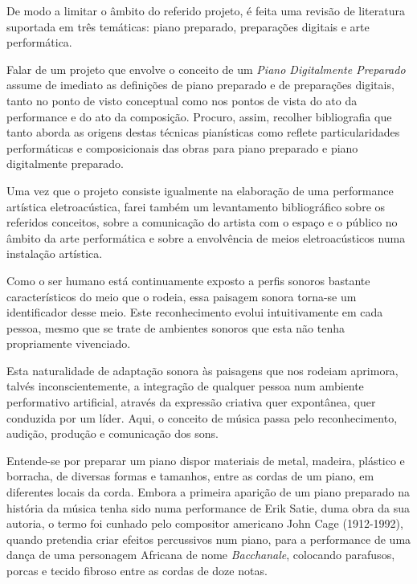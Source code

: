 \documentclass[../main.tex]{subfiles}
\begin{document}
De modo a limitar o âmbito do referido projeto, é feita uma revisão de literatura suportada em três temáticas: piano preparado, preparações digitais e arte performática.

Falar de um projeto que envolve o conceito de um \textit{Piano Digitalmente Preparado} assume de imediato as definições de piano preparado e de preparações digitais, tanto no ponto de visto conceptual como nos pontos de vista do ato da performance e do ato da composição. Procuro, assim, recolher bibliografia que tanto aborda as origens destas técnicas pianísticas como reflete particularidades performáticas e composicionais das obras para piano preparado e piano digitalmente preparado.

Uma vez que o projeto consiste igualmente na elaboração de uma performance artística eletroacústica, farei também um levantamento bibliográfico sobre os referidos conceitos, sobre a comunicação do artista com o espaço e o público no âmbito da arte performática e sobre a envolvência de meios eletroacústicos numa instalação artística.

Como o ser humano está continuamente exposto a perfis sonoros bastante característicos do meio que o rodeia, essa paisagem sonora torna-se um identificador desse meio\cite{schafer1993}. Este reconhecimento evolui intuitivamente em cada pessoa, mesmo que se trate de ambientes sonoros que esta não tenha propriamente vivenciado.

Esta naturalidade de adaptação sonora às paisagens que nos rodeiam aprimora, talvés inconscientemente, a integração de qualquer pessoa num ambiente performativo artificial, através da expressão criativa quer expontânea, quer conduzida por um líder. Aqui, o conceito de música passa pelo reconhecimento, audição, produção e comunicação dos sons\cite{paynter1992}.

Entende-se por preparar um piano dispor materiais de metal, madeira, plástico e borracha, de diversas formas e tamanhos, entre as cordas de um piano, em diferentes locais da corda\cite{anderson2012}. Embora a primeira aparição de um piano preparado na história da música tenha sido numa performance de Erik Satie, duma obra da sua autoria\cite{dianova2008}, o termo foi cunhado pelo compositor americano John Cage (1912-1992), quando pretendia criar efeitos percussivos num piano, para a performance de uma dança de uma personagem Africana de nome \textit{Bacchanale}, colocando parafusos, porcas e tecido fibroso entre as cordas de doze notas\cite{cage1981, pritchett1993, bunger1981}.
\end{document}
